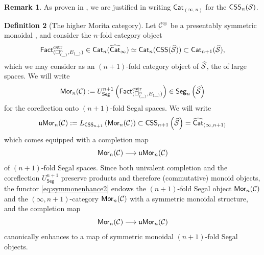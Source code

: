 \documentclass[10pt, reqno, twoside
, final
]{amsart}
\numberwithin{equation}{subsection}%
\theoremstyle{definition}
\newtheorem{defn}{Definition}[subsection]
\theoremstyle{definition}
\theoremstyle{definition}
\theoremstyle{definition}
\theoremstyle{definition}
\theoremstyle{definition}
\theoremstyle{definition}
\theoremstyle{definition}
\theoremstyle{definition}
\theoremstyle{plain}
\theoremstyle{definition}
\theoremstyle{plain}
\theoremstyle{definition}
\theoremstyle{plain}
\theoremstyle{definition}
\newtheorem{rmk}[defn]{Remark}
\theoremstyle{definition}
\theoremstyle{plain}
\theoremstyle{plain}
\theoremstyle{definition}
\theoremstyle{plain}
\theoremstyle{plain}
\theoremstyle{plain}
\begin{document}
\begin{rmk}
As proven in \cite{BarSP-unicity}, we are justified in writing $\mathsf{Cat}_{(\infty,n)}$ for the \infcat $\mathsf{CSS}_n(\mathcal{S})$.
\end{rmk}
\begin{defn}[The higher Morita category]\label{defn:moritacategory}
Let $\mathcal{C}^{\otimes}$ be a presentably symmetric monoidal \infcatt, and consider the $n$-fold category object \[\mathsf{Fact}^{\mathrm{cstr}}_{(\square^n_{(\_)},E_{(\_)})} \in \mathsf{Cat}_n(\widehat{\mathsf{Cat}}_{\infty}) \simeq \mathsf{Cat}_n(\mathsf{CSS}(\widehat{\mathcal{S}}))\subset   \mathsf{Cat}_{n+1}(\widehat{\mathcal{S}}), \]
which we may consider as an $(n+1)$-fold category object of $\widehat{\mathcal{S}}$, the \infcat of large spaces. We will write 
\[  \mathsf{Mor}_n(\mathcal{C}) := U^{n+1}_{\mathsf{Seg}}\left(\mathsf{Fact}^{\mathrm{cstr}}_{(\square^n_{(\_)},E_{(\_)})}\right)\in \mathsf{Seg}_n\left(\widehat{\mathcal{S}}\right) \]
for the coreflection onto $(n+1)$-fold Segal spaces. We will write
\[  \mathfrak{u}\mathsf{Mor}_n(\mathcal{C}) := L_{\mathsf{CSS}_{n+1}}\left(\mathsf{Mor}_n(\mathcal{C})\right) \subset \mathsf{CSS}_{n+1}\left(\widehat{\mathcal{S}}\right) = \widehat{\mathsf{Cat}}_{(\infty,n+1)} \]
which comes equipped with a completion map 
\[  \mathsf{Mor}_n(\mathcal{C})\longrightarrow \mathfrak{u}\mathsf{Mor}_n(\mathcal{C}) \]
of $(n+1)$-fold Segal spaces. Since both univalent completion and the coreflection $U^{n+1}_{\mathsf{Seg}}$ preserve products and therefore (commutative) monoid objects, the functor \eqref{eq:symmonenhance2} endows the $(n+1)$-fold Segal object $\mathsf{Mor}_n(\mathcal{C})$ and the $(\infty,n+1)$-category $\mathsf{Mor}_n(\mathcal{C})$ with a symmetric monoidal structure, and the completion map 
\[  \mathsf{Mor}_n(\mathcal{C})\longrightarrow \mathfrak{u}\mathsf{Mor}_n(\mathcal{C}) \]
canonically enhances to a map of symmetric monoidal $(n+1)$-fold Segal objects.
\end{defn}
\end{document}
